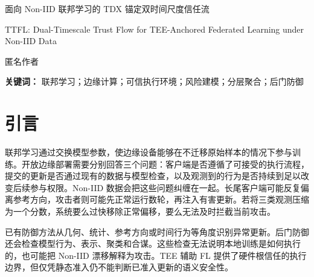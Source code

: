 \documentclass[10pt,a4paper,UTF8,fontset=fandol]{ctexart}
\begin{document}
\begin{center}
    {\Large 面向 Non-IID 联邦学习的 TDX 锚定双时间尺度信任流\par}
    \vspace{4pt}
    {\large TTFL: Dual-Timescale Trust Flow for TEE-Anchored Federated Learning under Non-IID Data\par}
    \vspace{8pt}
    {匿名作者\par}
\end{center}

\begin{abstract}
    联邦学习（FL）通过避免原始数据迁移来支持边缘智能协同训练，但开放参与带来信任连续性问题：客户端可能执行了可接受的训练过程，却产生有害更新；合法长尾客户端也可能在 Non-IID 数据下表现异常。本文提出 TTFL 信任流框架，将不同证据分配给不同决策。执行证据建立准入边界，隐私感知的数据与运行时检查提供有限统计证据，云端服务器在分配分层参与权限前审查更新内容与跨轮行为。框架的核心是长期效用与短期风险的时间分离：持续贡献信号支持客户端保留，而当前风险信号可以限制当轮更新，又不会立即抹除客户端的长期历史。保守的冷启动策略、显式状态转换以及风险门控的按数据量重归一化共同完成决策闭环。实验在 Intel TDX 锚定的客户端执行路径及配套主机配置上使用 Flower/PyTorch 和 CIFAR-10，包含每个配置 5 个种子、20 个准入客户端、6 类攻击行为和 30\% 恶意客户端。目标攻击 ASR 对三类目标行为取宏平均；无目标攻击通过干净准确率、损失和状态转换指标评估。在给定协议下，TTFL 达到 92.31\% 的干净准确率、10.21\% 的目标攻击 ASR，测试运行中没有出现永久误封。
\end{abstract}

\noindent\textbf{关键词：} 联邦学习；边缘计算；可信执行环境；风险建模；分层聚合；后门防御

\section{引言}

联邦学习通过交换模型参数，使边缘设备能够在不迁移原始样本的情况下参与训练\cite{kairouz2021flsurvey,mcmahan2017fedavg}。开放边缘部署需要分别回答三个问题：客户端是否遵循了可接受的执行流程，提交的更新是否通过现有的数据与模型检查，以及观测到的行为是否持续到足以改变后续参与权限。Non-IID 数据会把这些问题纠缠在一起。长尾客户端可能反复偏离参考方向，攻击者则可能先正常运行数轮，再注入有害更新。若将三类观测压缩为一个分数，系统要么过快移除正常偏移，要么无法及时拦截当前攻击。

已有防御方法从几何、统计、参考方向或时间行为等角度识别异常更新\cite{blanchard2017krum,yin2018byzantine,cao2021fltrust,fung2020foolsgold,fldetector2022}。后门防御还会检查模型行为、表示、聚类和合谋\cite{deepsight2022,flame2022,crowdguard2024,roseagg}。这些检查无法说明本地训练是如何执行的，也可能把 Non-IID 漂移解释为攻击。TEE 辅助 FL 提供了硬件根信任的执行边界\cite{r1_tee_integrity,xu2021distributed,r5_tee_mitigating,lu2025tmt}，但仅凭静态准入仍不能判断已准入更新的语义安全性。
\end{document}
